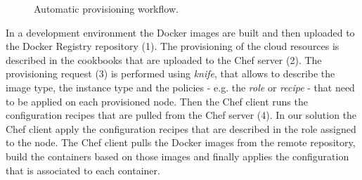 \begin{figure}[ht!]
  \centering
  \caption[Automatic provisioning workflow.]{Automatic provisioning workflow.}
  \label{fig:provisioning_tech_architecture}
\end{figure}

In a development environment the Docker images are built and then uploaded to the Docker Registry
repository (1). The provisioning of the cloud resources is described in the cookbooks that are uploaded
to the Chef server (2). The provisioning request (3) is performed using \textit{knife}, that allows to
describe the image type, the instance type and the policies - e.g. the \textit{role} or \textit{recipe} -
that need to be applied on each provisioned node. Then the Chef client runs the configuration recipes
that are pulled from the Chef server (4). In our solution the Chef client apply the configuration recipes
that are described in the role assigned to the node. The Chef client pulls the Docker images from the
remote repository, build the containers based on those images and finally applies the configuration
that is associated to each container.\\

